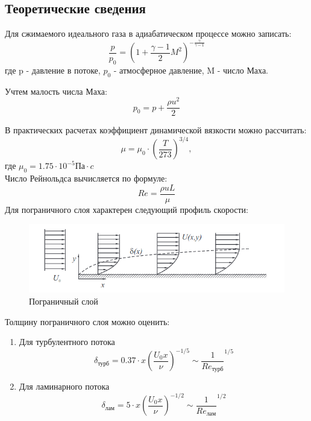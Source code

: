 \documentclass[12pt,a4paper]{article}
\begin{document}
\subsection*{Теоретические сведения}
    Для сжимаемого идеального газа в адиабатическом процессе можно записать:
    \begin{equation*}
        \frac{p}{p_0} = \left(1 + \frac{\gamma - 1}{2} M^2\right)^{- \frac{\gamma}{\gamma - 1}}
    \end{equation*}
     где p - давление в потоке, $p_0$ - атмосферное давление, M - число Маха.
    \par Учтем малость числа Маха:
    \begin{equation}\label{eq:1}
        p_0 = p + \frac{\rho u^2}{2}
    \end{equation}
    \par В практических расчетах коэффициент динамической вязкости можно рассчитать:
    \begin{equation}\label{eq:2}
        \mu = \mu_0 \cdot \left(\frac{T}{273}\right)^{3/4},
    \end{equation}
    где $\mu_0 = 1.75\cdot 10^{-5} Па \cdot c$ \\
    Число Рейнольдса вычисляется по формуле:
    \begin{equation}\label{eq:3}
        Re = \frac{\rho u L}{\mu}
    \end{equation}
    Для пограничного слоя характерен следующий профиль скорости:\\
    \begin{figure}[h!]
        \centering
        \includegraphics[width = 1.0 \textwidth]{last.png}
        \caption{Пограничный слой}
        \label{fig:my_label}
    \end{figure}
    Толщину пограничного слоя можно оценить:
    \begin{enumerate}
        \item Для турбулентного потока
        \begin{equation}
            \delta_{\text{турб}}= 0.37 \cdot x \left(\frac{U_0 x}{\nu}\right)^{-1/5} \sim \frac{1}{Re_{\text{турб}}}^{1/5}
        \end{equation}\label{eq:4}
        \item Для ламинарного потока
        \begin{equation}
            \delta_{\text{лам}} = 5\cdot x \left(\frac{U_0x}{\nu}\right)^{-1/2} \sim \frac{1}{Re_{\text{лам}}}^{1/2}
        \end{equation}\label{eq:5}
    \end{enumerate}
    
\end{document}
